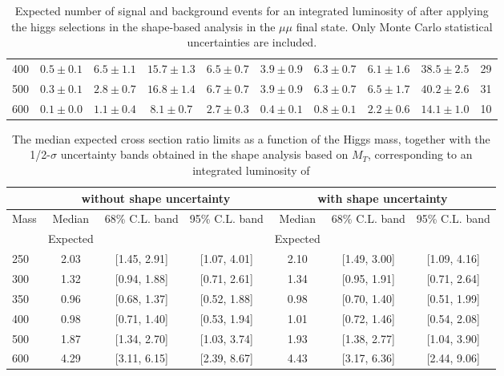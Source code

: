 \begin{table}
{\begin{center}
\begin{tabular}{l | c c |  c c c c c c | c }
400 & $0.5\pm0.1$ & $6.5\pm1.1$ & $15.7\pm1.3$ & $6.5\pm0.7$ & $3.9\pm0.9$ & $6.3\pm0.7$ & $6.1\pm1.6$ & $38.5\pm2.5$ & 29 \\
500 & $0.3\pm0.1$ & $2.8\pm0.7$ & $16.8\pm1.4$ & $6.7\pm0.7$ & $3.9\pm0.9$ & $6.3\pm0.7$ & $6.5\pm1.7$ & $40.2\pm2.6$ & 31 \\
600 & $0.1\pm0.0$ & $1.1\pm0.4$ & $8.1\pm0.7$ & $2.7\pm0.3$ & $0.4\pm0.1$ & $0.8\pm0.1$ & $2.2\pm0.6$ & $14.1\pm1.0$ & 10 \\
\hline
\end{tabular}
\end{center}
}
\caption{Expected number of signal and background events for an 
  integrated luminosity of \intlumi after applying the higgs selections in the shape-based analysis in the $\mu\mu$ final state. 
  Only Monte Carlo statistical uncertainties are included. }
\label{tab:yield_shapebased_mm}
\end{table}

\begin{table}
\begin{center}
{\normalsize
\begin{tabular}{|l|c|c|c|c|c|c|}
\hline
      &  \multicolumn{3}{c|}{ without shape uncertainty} &\multicolumn{3}{c|}{ with shape uncertainty} \\
\hline
Mass  &  Median      &     68\% C.L. band &  95\% C.L. band &  Median	   &	 68\% C.L. band &  95\% C.L. band\\
      &  Expected    &                    &                 &  Expected    &			&		 \\
\hline
250 & 2.03 & [1.45, 2.91] & [1.07, 4.01] & 2.10 & [1.49, 3.00] & [1.09, 4.16] \\
300 & 1.32 & [0.94, 1.88] & [0.71, 2.61] & 1.34 & [0.95, 1.91] & [0.71, 2.64] \\
350 & 0.96 & [0.68, 1.37] & [0.52, 1.88] & 0.98 & [0.70, 1.40] & [0.51, 1.99] \\ 
400 & 0.98 & [0.71, 1.40] & [0.53, 1.94] & 1.01 & [0.72, 1.46] & [0.54, 2.08] \\
500 & 1.87 & [1.34, 2.70] & [1.03, 3.74] & 1.93 & [1.38, 2.77] & [1.04, 3.90] \\
600 & 4.29 & [3.11, 6.15] & [2.39, 8.67] & 4.43 & [3.17, 6.36] & [2.44, 9.06] \\
\hline
\end{tabular}
}
\end{center}
\caption{The median expected cross section ratio limits as a function 
of the Higgs mass, together with the 1/2-$\sigma$ uncertainty bands obtained in the shape analysis based on $M_T$, corresponding to 
an integrated luminosity of \intlumi}
\label{tab:limits_mtshape_2fb}
\end{table}
